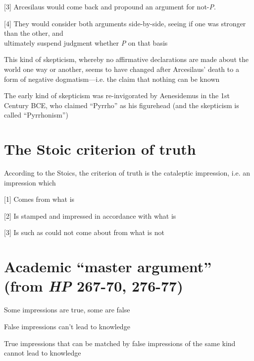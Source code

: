 \documentclass[11pt]{article}
\begin{document}
[3] Arcesilaus would come back and propound an argument for not-\emph{P}.
\vspace*{1mm}

[4] They would consider both arguments side-by-side, seeing if one was stronger than the other, and\\\hspace*{12mm}ultimately suspend judgment whether \emph{P} on that basis
\vspace*{2mm}

\noindent This kind of skepticism, whereby no affirmative declarations are made about the world one way or another, seems to have changed after Arcesilaus' death to a form of negative dogmatism---i.e. the claim that nothing can be known
\vspace*{2mm}

\noindent The early kind of skepticism was re-invigorated by Aenesidemus in the 1st Century BCE, who claimed ``Pyrrho'' as his figurehead (and the skepticism is called ``Pyrrhonism'')
\vspace*{-2mm}

\section*{The Stoic criterion of truth}

\noindent According to the Stoics, the criterion of truth is the cataleptic impression, i.e. an impression which
\vspace*{2mm}

[1] Comes from what is
\vspace*{1mm}

[2] Is stamped and impressed in accordance with what is
\vspace*{1mm}

[3] Is such as could not come about from what is not
\vspace*{-2mm}

\section*{Academic ``master argument'' (from \emph{HP} 267-70, 276-77)}

\noindent [P1] Some impressions are true, some are false
\vspace*{1mm}

\noindent [P2] False impressions can't lead to knowledge
\vspace*{1mm}

\noindent [P3] True impressions that can be matched by false impressions of the same kind cannot lead to knowledge
\vspace*{1mm}
\end{document}
